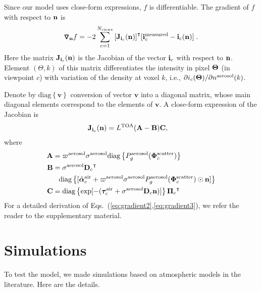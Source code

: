 \documentclass[10pt,twocolumn,letterpaper]{article}
\newcommand{\OpDiag}[1]{\mathrm{diag}\left\{#1\right\}}
\newcommand{\Grad}[1]{\bm{\triangledown_{#1}}}
\newcommand{\vect}[1]{\bm{#1}}
\newcommand{\transpose}[1]{{#1}^\intercal}
\begin{document}
Since our model uses close-form expressions, $f$ is differentiable. The gradient of $f$ with respect to ${\bf n}$ is
\begin{align}
  \Grad{{\bf n}} f = -2\sum_{c=1}^{N_{\rm views}}
  \transpose{\left[{\bf J}_{{\bf i}_c}({\bf n})\right]}
  [{\bf i}^{\rm measured}_c - {\bf i}_c({\bf n})]
  \;.
  \label{eq:gradient1}
\end{align}
Here the matrix ${\bf J}_{{\bf i}_c}({\bf n})$ is the Jacobian  of
the vector ${\bf i}_c$ with respect to ${\bf n}$. Element $(\Theta,k)$ of this matrix
differentiates the intensity in pixel ${\bf \Theta}$ (in viewpoint $c$) with variation of the density at voxel $k$, i.e.,
  $\partial i_c({\bf \Theta})/\partial{n^{\rm aerosol}(k)}$.

Denote by $\OpDiag{\vect{v}}$ conversion of vector $\vect{v}$ into a diagonal matrix, whose main diagonal elements correspond to the elements of $\vect{v}$.
A close-form expression of the Jacobian is
\begin{align}
  {\bf J}_{{\bf i}_c}({\bf n}) &= 
    L^{\rm TOA}({\bf A}-{\bf B}){\bf C} ,
  \label{eq:gradient2}
\end{align}
where
\begin{align}
  \label{eq:gradient3}
  {\bf A} &= 
    \varpi^{\rm aerosol}\sigma^{\rm aerosol}
         \OpDiag{ P_g^{\rm aerosol}(\vect{\Phi}^{\rm scatter}_c)} \nonumber\\
 {\bf B} &= {\sigma}^{\rm aerosol}\transpose{{\bf D}_c} \nonumber\\
       & \;\;\;
       \OpDiag{[\tilde{\vect{\alpha}}^{\rm air}_c 
                + \varpi^{\rm aerosol}\sigma^{\rm aerosol} 
                P^{\rm aerosol}_g(\vect{\Phi}^{\rm scatter}_c) \odot{\bf n}
                ]} \nonumber \\
  {\bf C} &= \OpDiag{\exp[-(\vect{\tau}_c^{\rm air} 
          + {\sigma}^{\rm aerosol} {\bf D}_c {\bf n})]} 
          \transpose{{\vect{\Pi}}_c}
\end{align}
For a detailed derivation of Eqs.~(\ref{eq:gradient2},\ref{eq:gradient3}),
we refer the reader to the supplementary material.



\section{Simulations}
\label{sec:simul}



To test the model, we made simulations based on atmospheric models in the literature. Here are the details.\\
\end{document}
